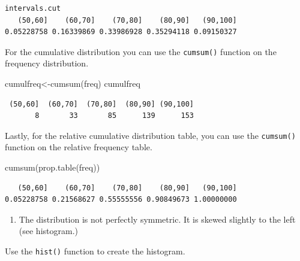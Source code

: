 \documentclass[
  letterpaper,
  DIV=11,
  numbers=noendperiod]{scrreprt}
\newenvironment{Shaded}{\begin{snugshade}}{\end{snugshade}}
\newcommand{\AttributeTok}[1]{\textcolor[rgb]{0.40,0.45,0.13}{#1}}
\newcommand{\ConstantTok}[1]{\textcolor[rgb]{0.56,0.35,0.01}{#1}}
\newcommand{\FunctionTok}[1]{\textcolor[rgb]{0.28,0.35,0.67}{#1}}
\newcommand{\NormalTok}[1]{\textcolor[rgb]{0.00,0.23,0.31}{#1}}
\newcommand{\OtherTok}[1]{\textcolor[rgb]{0.00,0.23,0.31}{#1}}
\newcommand{\SpecialCharTok}[1]{\textcolor[rgb]{0.37,0.37,0.37}{#1}}
\newcommand{\StringTok}[1]{\textcolor[rgb]{0.13,0.47,0.30}{#1}}
\providecommand{\tightlist}{%
  \setlength{\itemsep}{0pt}\setlength{\parskip}{0pt}}\usepackage{longtable,booktabs,array}
\begin{document}
\begin{verbatim}
intervals.cut
   (50,60]    (60,70]    (70,80]    (80,90]   (90,100] 
0.05228758 0.16339869 0.33986928 0.35294118 0.09150327 
\end{verbatim}

For the cumulative distribution you can use the \texttt{cumsum()}
function on the frequency distribution.

\begin{Shaded}
\begin{Highlighting}[numbers=left,,]
\NormalTok{cumulfreq}\OtherTok{\textless{}{-}}\FunctionTok{cumsum}\NormalTok{(freq)}
\NormalTok{cumulfreq}
\end{Highlighting}
\end{Shaded}

\begin{verbatim}
 (50,60]  (60,70]  (70,80]  (80,90] (90,100] 
       8       33       85      139      153 
\end{verbatim}

Lastly, for the relative cumulative distribution table, you can use the
\texttt{cumsum()} function on the relative frequency table.

\begin{Shaded}
\begin{Highlighting}[numbers=left,,]
\FunctionTok{cumsum}\NormalTok{(}\FunctionTok{prop.table}\NormalTok{(freq))}
\end{Highlighting}
\end{Shaded}

\begin{verbatim}
   (50,60]    (60,70]    (70,80]    (80,90]   (90,100] 
0.05228758 0.21568627 0.55555556 0.90849673 1.00000000 
\end{verbatim}

\begin{enumerate}
\def\labelenumi{\arabic{enumi}.}
\setcounter{enumi}{2}
\tightlist
\item
  The distribution is not perfectly symmetric. It is skewed slightly to
  the left (see histogram.)
\end{enumerate}

Use the \texttt{hist()} function to create the histogram.

\begin{Shaded}
\end{Shaded}
\end{document}
